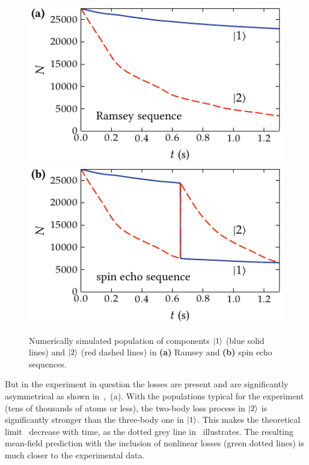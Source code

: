 \begin{figure}
    \centerline{%
    \includegraphics{figures_generated/bec_noise/ramsey_single_run_pop.pdf}%
    \includegraphics{figures_generated/bec_noise/echo_single_run_pop.pdf}}

    \caption[Component population in Ramsey and spin echo sequences]{
    Numerically simulated population of components $\mbox{\ensuremath{\left\vert 1 \right\rangle}}$ (blue solid lines) and $\mbox{\ensuremath{\left\vert 2 \right\rangle}}$ (red dashed lines) in \textbf{(a)} Ramsey and \textbf{(b)} spin echo sequences.}%

    \label{fig:bec-noise:visibility:population}
\end{figure}

But in the experiment in question the losses are present and are significantly asymmetrical as shown in~,~(a).
With the populations typical for the experiment (tens of thousands of atoms or less), the two-body loss process in $\mbox{\ensuremath{\left\vert 2 \right\rangle}}$ is significantly stronger than the three-body one in $\mbox{\ensuremath{\left\vert 1 \right\rangle}}$.
This makes the theoretical limit~ decrease with time, as the dotted grey line in~ illustrates.
The resulting mean-field prediction with the inclusion of nonlinear losses (green dotted lines) is much closer to the experimental data.

